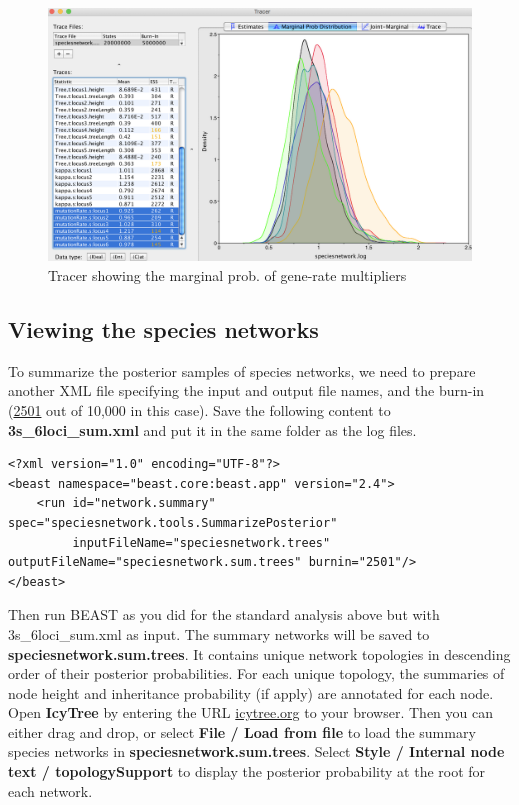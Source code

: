 \documentclass[11pt]{article}
\begin{document}
\begin{figure}[h]
\center
\includegraphics[width=1.0\textwidth]{figs/fig11_tracer2.png}
\caption{Tracer showing the marginal prob. of gene-rate multipliers}
\label{fig_tracer2}
\end{figure}

\clearpage

\subsection*{Viewing the species networks}

To summarize the posterior samples of species networks, we need to prepare another XML file specifying the input and output file names, and the burn-in (\underline{2501} out of 10,000 in this case). Save the following content to \textbf{3s\_6loci\_sum.xml} and put it in the same folder as the log files.

{\tiny
\begin{verbatim}
<?xml version="1.0" encoding="UTF-8"?>
<beast namespace="beast.core:beast.app" version="2.4">
    <run id="network.summary" spec="speciesnetwork.tools.SummarizePosterior"
         inputFileName="speciesnetwork.trees" outputFileName="speciesnetwork.sum.trees" burnin="2501"/>
</beast>
\end{verbatim}}

\noindent Then run BEAST as you did for the standard analysis above but with 3s\_6loci\_sum.xml as input. The summary networks will be saved to \textbf{speciesnetwork.sum.trees}. It contains unique network topologies in descending order of their posterior probabilities. For each unique topology, the summaries of node height and inheritance probability (if apply) are annotated for each node. 
Open \textbf{IcyTree} by entering the URL \url{icytree.org} to your browser. Then you can either drag and drop, or select \textbf{File / Load from file} to load the summary species networks in \textbf{speciesnetwork.sum.trees}. Select \textbf{Style / Internal node text / topologySupport} to display the posterior probability at the root for each network.
\end{document}
